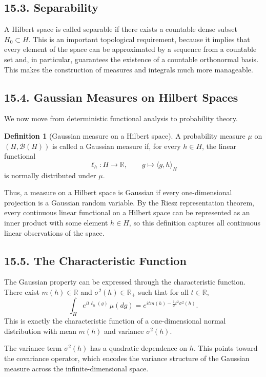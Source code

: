 \documentclass[11pt]{article}
\theoremstyle{definition}
\newtheorem{definition}{Definition}
\theoremstyle{remark}
\begin{document}
\subsection*{15.3. Separability}
A Hilbert space is called separable if there exists a countable dense subset $H_0\subset H$. This is an important topological requirement, because it implies that every element of the space can be approximated by a sequence from a countable set and, in particular, guarantees the existence of a countable orthonormal basis. This makes the construction of measures and integrals much more manageable.

\subsection*{15.4. Gaussian Measures on Hilbert Spaces}
We now move from deterministic functional analysis to probability theory.

\begin{definition}[Gaussian measure on a Hilbert space]
A probability measure $\mu$ on $(H,\mathcal B(H))$ is called a Gaussian measure if, for every $h\in H$, the linear functional
\[
\ell_h:H\to\mathbb R,\qquad g\mapsto \langle g,h\rangle_H
\]
is normally distributed under $\mu$.
\end{definition}

Thus, a measure on a Hilbert space is Gaussian if every one-dimensional projection is a Gaussian random variable. By the Riesz representation theorem, every continuous linear functional on a Hilbert space can be represented as an inner product with some element $h\in H$, so this definition captures all continuous linear observations of the space.

\subsection*{15.5. The Characteristic Function}
The Gaussian property can be expressed through the characteristic function. There exist $m(h)\in\mathbb R$ and $\sigma^2(h)\in\mathbb R_+$ such that for all $t\in\mathbb R$,
\[
\int_H e^{it\ell_h(g)}\,\mu(dg)=e^{itm(h)-\frac12 t^2\sigma^2(h)}.
\]
This is exactly the characteristic function of a one-dimensional normal distribution with mean $m(h)$ and variance $\sigma^2(h)$.

The variance term $\sigma^2(h)$ has a quadratic dependence on $h$. This points toward the covariance operator, which encodes the variance structure of the Gaussian measure across the infinite-dimensional space.
\end{document}
